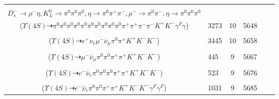 \documentclass[landscape]{article}
\newcounter{rownumbers}
\newcommand\rn{\stepcounter{rownumbers}\arabic{rownumbers}}
\newcommand{\EOL}{\\} %
\newcommand{\topoTags}[1]{#1} %
\begin{document}
\begin{longtable}{clcccc}
\rn & \makecell[l]{ $ 
\Upsilon(4S) \rightarrow B^{0} \bar{B}^{0} ,
B^{0} \rightarrow \pi^{0} K^{+} K^{-} \gamma^{F} ,
\bar{B}^{0} \rightarrow D^{*+} D_{s}^{*-} ,
D^{*+} \rightarrow \pi^{+} D^{0} ,
D_{s}^{*-} \rightarrow D_{s}^{-} \gamma ,
D^{0} \rightarrow \pi^{0} K_{L}^{0} \eta ,
$ \\ $
D_{s}^{-} \rightarrow \rho^{-} \eta ,
K_{L}^{0} \rightarrow \pi^{0} \pi^{0} \pi^{0} ,
\eta \rightarrow \pi^{0} \pi^{+} \pi^{-} ,
\rho^{-} \rightarrow \pi^{0} \pi^{-} ,
\eta \rightarrow \pi^{0} \pi^{0} \pi^{0} 
$ \\ ($
\Upsilon(4S) \dashrightarrow \pi^{0} \pi^{0} \pi^{0} \pi^{0} \pi^{0} \pi^{0} \pi^{0} \pi^{0} \pi^{0} \pi^{0} \pi^{+} \pi^{+} \pi^{-} \pi^{-} K^{+} K^{-} \gamma^{F} \gamma 
$) } & \topoTags{3273 & }10 & 5648 \EOL

\rn & \makecell[l]{ $ 
\Upsilon(4S) \rightarrow B^{0} \bar{B}^{0} ,
B^{0} \rightarrow \pi^{0} K^{+} K^{-} ,
\bar{B}^{0} \rightarrow \mu^{-} \bar{\nu}_{\mu} D^{*+} ,
D^{*+} \rightarrow \pi^{+} D^{0} ,
D^{0} \rightarrow e^{+} \nu_{e} K^{-} 
$ \\ ($
\Upsilon(4S) \dashrightarrow e^{+} \nu_{e} \mu^{-} \bar{\nu}_{\mu} \pi^{0} \pi^{+} K^{+} K^{-} K^{-} 
$) } & \topoTags{3445 & }10 & 5658 \EOL

\rn & \makecell[l]{ $ 
\Upsilon(4S) \rightarrow B^{0} \bar{B}^{0} ,
B^{0} \rightarrow \pi^{0} K^{+} K^{-} ,
\bar{B}^{0} \rightarrow \mu^{-} \bar{\nu}_{\mu} D^{+} ,
D^{+} \rightarrow \pi^{0} \pi^{+} \bar{K}^{*} ,
\bar{K}^{*} \rightarrow \pi^{+} K^{-} 
$ \\ ($
\Upsilon(4S) \dashrightarrow \mu^{-} \bar{\nu}_{\mu} \pi^{0} \pi^{0} \pi^{+} \pi^{+} K^{+} K^{-} K^{-} 
$) } & \topoTags{445 & }9 & 5667 \EOL

\rn & \makecell[l]{ $ 
\Upsilon(4S) \rightarrow B^{0} \bar{B}^{0} ,
B^{0} \rightarrow \pi^{0} K^{+} K^{-} ,
\bar{B}^{0} \rightarrow e^{-} \bar{\nu}_{e} D^{*+} ,
D^{*+} \rightarrow \pi^{0} D^{+} ,
D^{+} \rightarrow \pi^{0} \pi^{+} \bar{K}^{*} ,
\bar{K}^{*} \rightarrow \pi^{+} K^{-} 
$ \\ ($
\Upsilon(4S) \dashrightarrow e^{-} \bar{\nu}_{e} \pi^{0} \pi^{0} \pi^{0} \pi^{+} \pi^{+} K^{+} K^{-} K^{-} 
$) } & \topoTags{523 & }9 & 5676 \EOL

\rn & \makecell[l]{ $ 
\Upsilon(4S) \rightarrow B^{0} \bar{B}^{0} ,
B^{0} \rightarrow \pi^{0} K^{+} K^{-} \gamma^{F} ,
\bar{B}^{0} \rightarrow e^{-} \bar{\nu}_{e} D^{*+} \gamma^{F} ,
D^{*+} \rightarrow \pi^{+} D^{0} ,
D^{0} \rightarrow \pi^{0} \pi^{+} K^{-} 
$ \\ ($
\Upsilon(4S) \dashrightarrow e^{-} \bar{\nu}_{e} \pi^{0} \pi^{0} \pi^{+} \pi^{+} K^{+} K^{-} K^{-} \gamma^{F} \gamma^{F} 
$) } & \topoTags{1031 & }9 & 5685 \EOL


\end{longtable}
\end{document}
